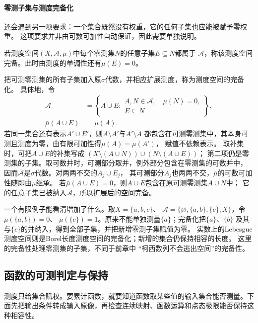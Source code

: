\paragraph{零测子集与测度完备化}

还会遇到另一项要求：一个集合既然没有权重，它的任何子集也应能被赋予零权重。
这项要求并非由可数可加性自动保证，因此需要单独说明。
\begin{definition}[完备测度空间]
\label{def:analysis-complete-measure-space}
若测度空间$(X,\mathcal{A},\mu)$中每个零测集$N$的任意子集$E\subseteq N$都属于
$\mathcal{A}$，称该测度空间完备。此时由测度的单调性还有$\mu(E)=0$。
\end{definition}
把可测零测集的所有子集加入原$\sigma$代数，并相应扩展测度，称为测度空间的完备化。
具体地，令
\[
 \begin{aligned}
 \overline{\mathcal A}
 &=\left\{A\cup E:
     \begin{array}{l}
       A,N\in\mathcal A,\quad \mu(N)=0,\\
       E\subseteq N
     \end{array}\right\},\\
 \bar\mu(A\cup E)&=\mu(A).
 \end{aligned}
\]
若同一集合还有表示$A'\cup E'$，则$A\setminus A'$与$A'\setminus A$
都包含在可测零测集中，其本身可测且测度为零，由有限可加性得$\mu(A)=\mu(A')$，
赋值不依赖表示。
取补集时，可把$A\cup E$的补集写成
$(X\setminus(A\cup N))\cup(N\setminus(A\cup E))$；
第二项仍是零测集的子集。取可数并时，可测部分取并，例外部分包含在零测集的可数并中，
因而$\overline{\mathcal A}$是$\sigma$代数。对两两不交的$A_j\cup E_j$，
其可测部分$A_j$也两两不交，$\bar\mu$的可数可加性随即由$\mu$继承。
若$\bar\mu(A\cup E)=0$，则$A\cup E$包含在原可测零测集$A\cup N$中；
它的任意子集已被纳入$\overline{\mathcal A}$，所以扩展后的空间完备。

一个有限例子能看清增加了什么。取$X=\{a,b,c\}$、
$\mathcal A=\{\varnothing,\{a,b\},\{c\},X\}$，令$\mu(\{a,b\})=0$、
$\mu(\{c\})=1$。原来不能单独测量$\{a\}$；完备化把$\{a\}$、$\{b\}$
及其与$\{c\}$的并纳入，得到全部子集，并把新增零测子集赋值为零。
实数上的Lebesgue测度空间则是Borel长度测度空间的完备化；新增的集合仍保持相容的长度。
这里的完备性处理零测集的子集，不同于前章中
“柯西数列不会逃出空间”的完备性。

\subsection{函数的可测判定与保持}

测度只给集合赋权。要累计函数，就要知道函数取某些值的输入集合能否测量。下面先把输出条件转成输入原像，再检查连续映射、函数运算和点态极限能否保持这种相容性。

